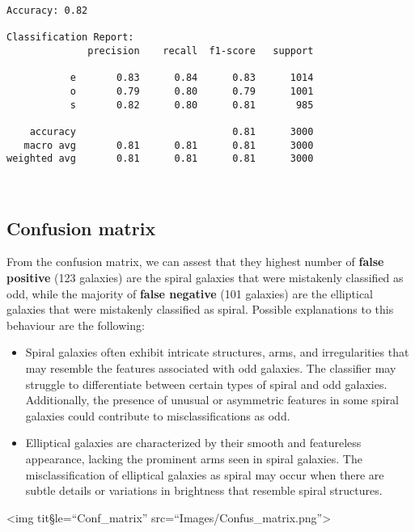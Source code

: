 \documentclass[11pt]{article}
\begin{document}
    \begin{Verbatim}[commandchars=\\\{\}]
Accuracy: 0.82

Classification Report:
              precision    recall  f1-score   support

           e       0.83      0.84      0.83      1014
           o       0.79      0.80      0.79      1001
           s       0.82      0.80      0.81       985

    accuracy                           0.81      3000
   macro avg       0.81      0.81      0.81      3000
weighted avg       0.81      0.81      0.81      3000



    \end{Verbatim}

    \subsection{Confusion matrix}\label{confusion-matrix}

From the confusion matrix, we can assest that they highest number of
\textbf{false positive} (123 galaxies) are the spiral galaxies that were
mistakenly classified as odd, while the majority of \textbf{false
negative} (101 galaxies) are the elliptical galaxies that were
mistakenly classified as spiral. Possible explanations to this behaviour
are the following:

\begin{itemize}
\item
  Spiral galaxies often exhibit intricate structures, arms, and
  irregularities that may resemble the features associated with odd
  galaxies. The classifier may struggle to differentiate between certain
  types of spiral and odd galaxies. Additionally, the presence of
  unusual or asymmetric features in some spiral galaxies could
  contribute to misclassifications as odd.
\item
  Elliptical galaxies are characterized by their smooth and featureless
  appearance, lacking the prominent arms seen in spiral galaxies. The
  misclassification of elliptical galaxies as spiral may occur when
  there are subtle details or variations in brightness that resemble
  spiral structures.
\end{itemize}

\textless img tit§le=``Conf\_matrix''
src=``Images/Confus\_matrix.png''\textgreater{}


    
    
    
\end{document}
